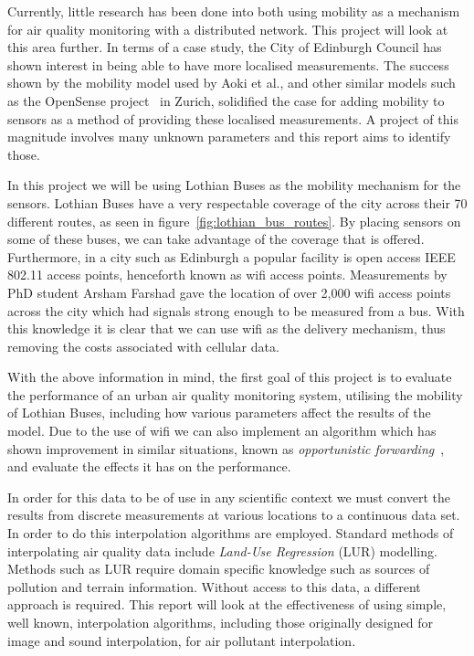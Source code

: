     Currently, little research has been done into both using mobility as a mechanism for air quality monitoring with a distributed network. This project will look at this area further. In terms of a case study, the City of Edinburgh Council has shown interest in being able to have more localised measurements. The success shown by the mobility model used by Aoki et al., and other similar models such as the OpenSense project~\cite{opensensezurich} in Zurich, solidified the case for adding mobility to sensors as a method of providing these localised measurements. A project of this magnitude involves many unknown parameters and this report aims to identify those. 

    In this project we will be using Lothian Buses as the mobility mechanism for the sensors. Lothian Buses have a very respectable coverage of the city across their 70 different routes, as seen in figure~\ref{fig:lothian_bus_routes}. By placing sensors on some of these buses, we can take advantage of the coverage that is offered. Furthermore, in a city such as Edinburgh a popular facility is open access IEEE 802.11 access points, henceforth known as wifi access points. Measurements by PhD student Arsham Farshad gave the location of over 2,000 wifi access points across the city which had signals strong enough to be measured from a bus. With this knowledge it is clear that we can use wifi as the delivery mechanism, thus removing the costs associated with cellular data. 


    With the above information in mind, the first goal of this project is to evaluate the performance of an urban air quality monitoring system, utilising the mobility of Lothian Buses, including how various parameters affect the results of the model. Due to the use of wifi we can also implement an algorithm which has shown improvement in similar situations, known as \emph{opportunistic forwarding}~\cite{opporunisticforwarding}, and evaluate the effects it has on the performance. 

    In order for this data to be of use in any scientific context we must convert the results from discrete measurements at various locations to a continuous data set. In order to do this interpolation algorithms are employed. Standard methods of interpolating air quality data include \emph{Land-Use Regression} (LUR) modelling. Methods such as LUR require domain specific knowledge such as sources of pollution and terrain information. Without access to this data, a different approach is required. This report will look at the effectiveness of using simple, well known, interpolation algorithms, including those originally designed for image and sound interpolation, for air pollutant interpolation.

